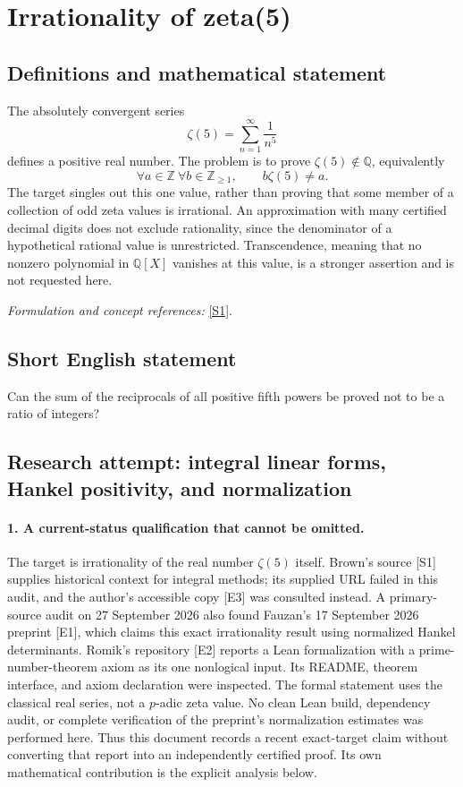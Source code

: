 \documentclass[11pt]{article}
\begin{document}
\section*{\texorpdfstring{Irrationality of zeta(5)}{Irrationality of zeta(5)}}\label{327}
\subsection{Definitions and mathematical statement}
The absolutely convergent series
\[
 \zeta(5)=\sum_{n=1}^{\infty}\frac1{n^5}
\]
defines a positive real number. The problem is to prove $\zeta(5)\notin{\mathbb{Q}}$, equivalently
\[
 \forall a\in{\mathbb{Z}}\ \forall b\in{\mathbb{Z}}_{\ge1},\qquad b\zeta(5)\ne a.
\]
The target singles out this one value, rather than proving that some member of a collection of odd zeta values is irrational. An approximation with many certified decimal digits does not exclude rationality, since the denominator of a hypothetical rational value is unrestricted. Transcendence, meaning that no nonzero polynomial in ${\mathbb{Q}}[X]$ vanishes at this value, is a stronger assertion and is not requested here.
\par\smallskip\textit{Formulation and concept references:} \href{https://www2.mathematik.hu-berlin.de/~kreimer/wp-content/uploads/IrratModuliMotivesv8.pdf}{[S1]}.

\subsection{Short English statement}
Can the sum of the reciprocals of all positive fifth powers be proved not to be a ratio of integers?
\subsection{Research attempt: integral linear forms, Hankel positivity, and normalization}
\paragraph{1. A current-status qualification that cannot be omitted.}
The target is irrationality of the real number $\zeta(5)$ itself. Brown's source [S1] supplies historical context for integral methods; its supplied URL failed in this audit, and the author's accessible copy [E3] was consulted instead. A primary-source audit on 27 September 2026 also found Fauzan's 17 September 2026 preprint [E1], which claims this exact irrationality result using normalized Hankel determinants. Romik's repository [E2] reports a Lean formalization with a prime-number-theorem axiom as its one nonlogical input. Its README, theorem interface, and axiom declaration were inspected. The formal statement uses the classical real series, not a $p$-adic zeta value. No clean Lean build, dependency audit, or complete verification of the preprint's normalization estimates was performed here. Thus this document records a recent exact-target claim without converting that report into an independently certified proof. Its own mathematical contribution is the explicit analysis below.
\end{document}
